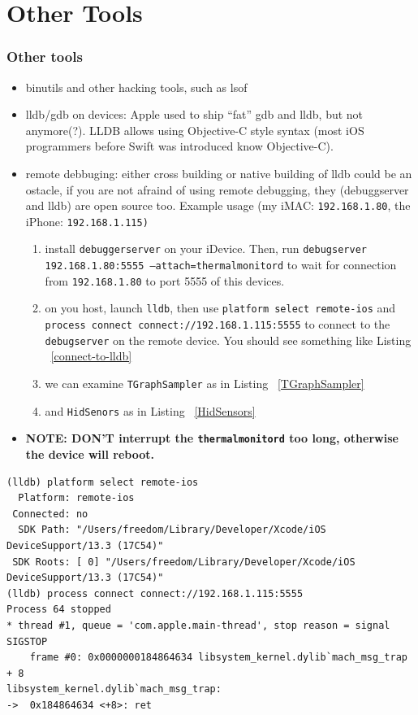 \documentclass{beamer}
\begin{document}
\section{Other Tools}
\begin{frame}
  \frametitle{Other tools}
  \begin{itemize}
  \item binutils and other hacking tools, such as lsof
  \item lldb/gdb on devices: Apple used to ship ``fat'' gdb and lldb, but not anymore(?). LLDB allows using Objective-C style syntax (most iOS programmers before Swift was introduced know Objective-C).
  \item remote debbuging: either cross building or native building of lldb could be an ostacle, if you are not afraind of using remote debugging, they (debuggserver and lldb) are open source too. Example usage (my iMAC: \texttt{192.168.1.80}, the iPhone: \texttt{192.168.1.115)}
    \begin{enumerate}
    \item install \texttt{debuggerserver} on your iDevice. Then, run \texttt{debugserver 192.168.1.80:5555 --attach=thermalmonitord} to wait for connection from \texttt{192.168.1.80} to port 5555 of this devices.
    \item on you host, launch \texttt{lldb}, then use \texttt{platform select remote-ios} and \texttt{process connect connect://192.168.1.115:5555} to connect to the \texttt{debugserver} on the remote device. You should see something like Listing ~\ref{connect-to-lldb}
    \item we can examine \texttt{TGraphSampler} as in Listing ~\ref{TGraphSampler}
    \item and \texttt{HidSenors} as in Listing ~\ref{HidSensors}
    \end{enumerate}
    \item \textbf{NOTE: DON'T interrupt the \texttt{thermalmonitord} too long, otherwise the device will reboot.}
  \end{itemize}
  \begin{adjustbox}{width=\textwidth,keepaspectratio}
    \begin{lstlisting}[caption={connect to debugserver from lldb},label={connect-to-lldb}]
(lldb) platform select remote-ios
  Platform: remote-ios
 Connected: no
  SDK Path: "/Users/freedom/Library/Developer/Xcode/iOS DeviceSupport/13.3 (17C54)"
 SDK Roots: [ 0] "/Users/freedom/Library/Developer/Xcode/iOS DeviceSupport/13.3 (17C54)"
(lldb) process connect connect://192.168.1.115:5555
Process 64 stopped
* thread #1, queue = 'com.apple.main-thread', stop reason = signal SIGSTOP
    frame #0: 0x0000000184864634 libsystem_kernel.dylib`mach_msg_trap + 8
libsystem_kernel.dylib`mach_msg_trap:
->  0x184864634 <+8>: ret    


\end{lstlisting}
\end{adjustbox}
\end{frame}
\end{document}
